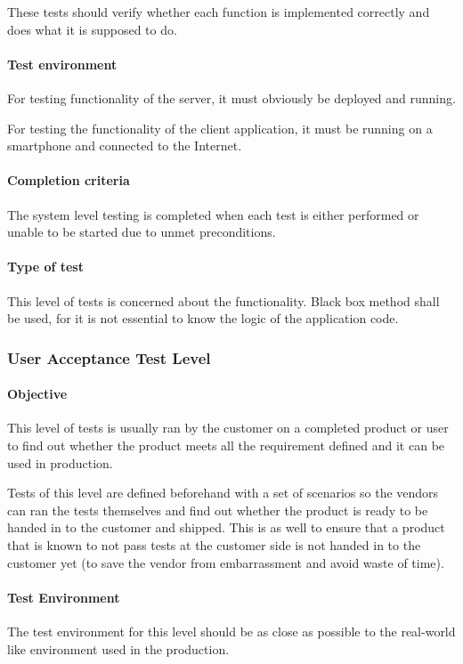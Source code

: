 \documentclass[11pt]{book}
\begin{document}
These tests should verify whether each function is implemented correctly and does what it is supposed to do.

\paragraph{Test environment}
For testing functionality of the server, it must obviously be deployed and running.

For testing the functionality of the client application, it must be running on a smartphone and connected to the Internet.

\paragraph{Completion criteria}
The system level testing is completed when each test is either performed or unable to be started due to unmet preconditions.

\paragraph{Type of test}
This level of tests is concerned about the functionality. Black box method shall be used, for it is not essential to know the logic of the application code. 


\subsubsection{User Acceptance Test Level}

\paragraph{Objective}
This level of tests is usually ran by the customer on a completed product or user to find out whether the product meets all the requirement defined and it can be used in production.

Tests of this level are defined beforehand with a set of scenarios so the vendors can ran the tests themselves and find out whether the product is ready to be handed in to the customer and shipped. This is as well to ensure that a product that is known to not pass tests at the customer side is not handed in to the customer yet (to save the vendor from embarrassment and avoid waste of time).

\paragraph{Test Environment}
The test environment for this level should be as close as possible to the real-world like environment used in the production.
\end{document}
